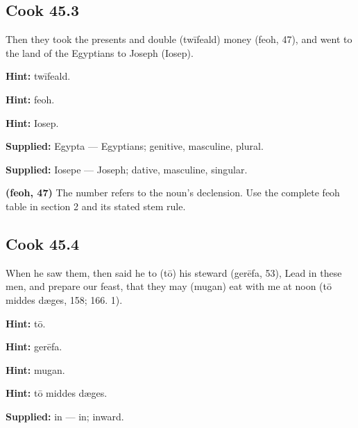 \par\begin{minipage}{\linewidth}\raggedright
\subsection*{Cook 45.3}

Then they took the presents and double (twīfeald) money (feoh, 47), and went to the land of the Egyptians to Joseph (Iosep).

\textbf{Hint:} twīfeald.

\textbf{Hint:} feoh.

\textbf{Hint:} Iosep.

\end{minipage}\par\addvspace{4pt}

\textbf{Supplied:} Egypta — Egyptians; genitive, masculine, plural.

\textbf{Supplied:} Iosepe — Joseph; dative, masculine, singular.

\textbf{(feoh, 47)} The number refers to the noun’s declension. Use the complete feoh table in section 2 and its stated stem rule.

\par\begin{minipage}{\linewidth}\raggedright
\subsection*{Cook 45.4}

When he saw them, then said he to (tō) his steward (gerēfa, 53), Lead in these men, and prepare our feast, that they may (mugan) eat with me at noon (tō middes dæges, 158; 166. 1).

\textbf{Hint:} tō.

\textbf{Hint:} gerēfa.

\textbf{Hint:} mugan.

\textbf{Hint:} tō middes dæges.

\textbf{Supplied:} in — in; inward.

\end{minipage}\par\addvspace{4pt}

